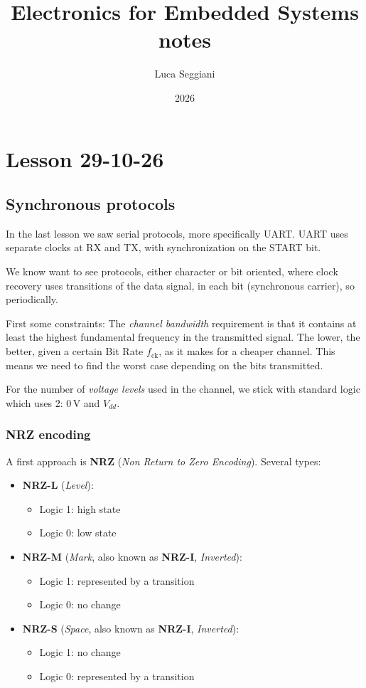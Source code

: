 \documentclass[a4paper,11pt]{article}
\title{Electronics for Embedded Systems notes}
\author{Luca Seggiani}
\date{2026}
\begin{document}
\section{Lesson 29-10-26}

\thispagestyle{empty}
\pagestyle{fancy}

\subsection{Synchronous protocols}

In the last lesson we saw serial protocols, more specifically UART.
UART uses separate clocks at RX and TX, with synchronization on the START bit.

We know want to see protocols, either character or bit oriented, where clock recovery uses transitions of the data signal, in each bit (synchronous carrier), so periodically.

First some constraints:
The \textit{channel bandwidth} requirement is that it contains at  least the highest fundamental frequency in the transmitted signal.
The lower, the better, given a certain Bit Rate $f_\text{ck}$, as it makes for a cheaper channel.
This means we need to find the worst case depending on the bits transmitted.

For the number of \textit{voltage levels} used in the channel, we stick with standard logic which uses 2: $0 \, \mathrm{V}$ and $V_{dd}$.

\subsubsection{NRZ encoding}

A first approach is \textbf{NRZ} (\textit{Non Return to Zero Encoding}).
Several types:
\begin{itemize}
\item \textbf{NRZ-L} (\textit{Level}):
\begin{itemize}
\item Logic 1: high state
\item Logic 0: low state
\end{itemize}
\item \textbf{NRZ-M} (\textit{Mark}, also known as \textbf{NRZ-I}, \textit{Inverted}):
\begin{itemize}
\item Logic 1: represented by a transition
\item Logic 0: no change
\end{itemize}
\item \textbf{NRZ-S} (\textit{Space}, also known as \textbf{NRZ-I}, \textit{Inverted}):
\begin{itemize}
\item Logic 1: no change
\item Logic 0: represented by a transition
\end{itemize}
\end{itemize}
\end{document}

